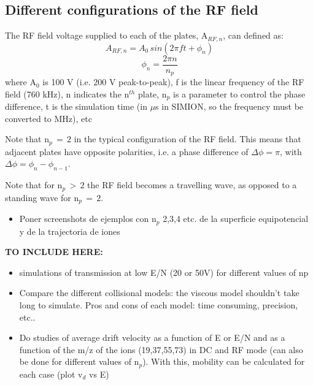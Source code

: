 \subsection{Different configurations of the RF field}

The RF field voltage supplied to each of the plates, A$_{RF,n}$, can defined as:
\begin{equation}
A_{RF,n} = A_0\,sin\left(2 \pi f t + \phi_n    \right)
\label{eq:rf}
\end{equation}
\begin{equation}
\phi_n =  \frac{2 \pi n  }{n_p}
\label{eq:phase}
\end{equation}
where A$_0$ is 100 V (i.e. 200 V peak-to-peak), f is the linear frequency of the RF field (760 kHz), n indicates the n$^{th}$ plate, n$_p$ is a parameter to control the phase difference, t is the simulation time (in $\mu$s in SIMION, so the frequency must be converted to MHz), etc

Note that n$_p\,=\,2$ in the typical configuration of the RF field. This means that adjacent plates have opposite polarities, i.e. a phase difference of $\Delta\phi = \pi$, with $\Delta\phi = \phi_n - \phi_{n-1}$.

Note that for n$_p\,>\,2$ the RF field becomes a travelling wave, as opposed to a standing wave for n$_p\,=\,2$.

\begin{itemize}
\item Poner screenshots de ejemplos con n$_p$ 2,3,4 etc. de la superficie equipotencial y de la trajectoria de iones
\end{itemize}


\textbf{TO INCLUDE HERE: }
\begin{itemize}
\item simulations of transmission at low E/N (20 or 50V) for different values of np
\item Compare the different collisional models: the viscous model shouldn't take long to simulate. Pros and cons of each model: time consuming, precision, etc..
\item Do studies of average drift velocity as a function of E or E/N and as a function of the m/z of the ions (19,37,55,73) in DC and RF mode (can also be done for different values of n$_p$). With this, mobility can be calculated for each case (plot v$_d$ vs E)
\end{itemize}



